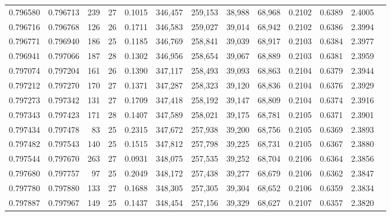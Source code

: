 \begin{tabular}{rrrrrrrrrrrrr}
0.796580 & 0.796713 &   239 &  27 &                                     0.1015 & 346,457 & 259,153 &  38,988 &  68,968 & 0.2102 & 0.6389 & 2.4005 \\
0.796716 & 0.796768 &   126 &  26 &                                     0.1711 & 346,583 & 259,027 &  39,014 &  68,942 & 0.2102 & 0.6386 & 2.3994 \\
0.796771 & 0.796940 &   186 &  25 &                                     0.1185 & 346,769 & 258,841 &  39,039 &  68,917 & 0.2103 & 0.6384 & 2.3977 \\
0.796941 & 0.797066 &   187 &  28 &                                     0.1302 & 346,956 & 258,654 &  39,067 &  68,889 & 0.2103 & 0.6381 & 2.3959 \\
0.797074 & 0.797204 &   161 &  26 &                                     0.1390 & 347,117 & 258,493 &  39,093 &  68,863 & 0.2104 & 0.6379 & 2.3944 \\
0.797212 & 0.797270 &   170 &  27 &                                     0.1371 & 347,287 & 258,323 &  39,120 &  68,836 & 0.2104 & 0.6376 & 2.3929 \\
0.797273 & 0.797342 &   131 &  27 &                                     0.1709 & 347,418 & 258,192 &  39,147 &  68,809 & 0.2104 & 0.6374 & 2.3916 \\
0.797343 & 0.797423 &   171 &  28 &                                     0.1407 & 347,589 & 258,021 &  39,175 &  68,781 & 0.2105 & 0.6371 & 2.3901 \\
0.797434 & 0.797478 &    83 &  25 &                                     0.2315 & 347,672 & 257,938 &  39,200 &  68,756 & 0.2105 & 0.6369 & 2.3893 \\
0.797482 & 0.797543 &   140 &  25 &                                     0.1515 & 347,812 & 257,798 &  39,225 &  68,731 & 0.2105 & 0.6367 & 2.3880 \\
0.797544 & 0.797670 &   263 &  27 &                                     0.0931 & 348,075 & 257,535 &  39,252 &  68,704 & 0.2106 & 0.6364 & 2.3856 \\
0.797680 & 0.797757 &    97 &  25 &                                     0.2049 & 348,172 & 257,438 &  39,277 &  68,679 & 0.2106 & 0.6362 & 2.3847 \\
0.797780 & 0.797880 &   133 &  27 &                                     0.1688 & 348,305 & 257,305 &  39,304 &  68,652 & 0.2106 & 0.6359 & 2.3834 \\
0.797887 & 0.797967 &   149 &  25 &                                     0.1437 & 348,454 & 257,156 &  39,329 &  68,627 & 0.2107 & 0.6357 & 2.3820 \\

\end{tabular}
